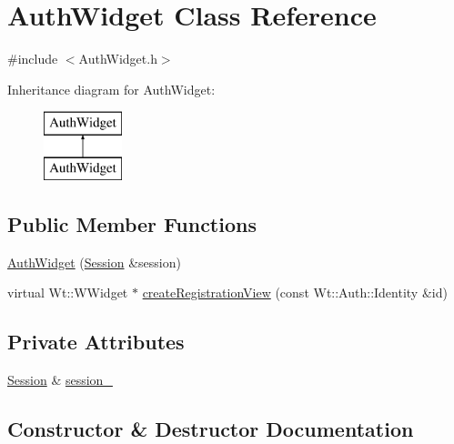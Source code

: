 \hypertarget{class_auth_widget}{}\section{Auth\+Widget Class Reference}
\label{class_auth_widget}


{\ttfamily \#include $<$Auth\+Widget.\+h$>$}

Inheritance diagram for Auth\+Widget\+:\begin{figure}[H]
\begin{center}
\leavevmode
\includegraphics[height=2.000000cm]{class_auth_widget}
\end{center}
\end{figure}
\subsection*{Public Member Functions}
\begin{DoxyCompactItemize}
\item 
\hyperlink{class_auth_widget_a16b0f0ad98e79aa40992cfaa9a00cfde}{Auth\+Widget} (\hyperlink{class_session}{Session} \&session)
\item 
virtual Wt\+::\+W\+Widget $\ast$ \hyperlink{class_auth_widget_abfa295703272e72a5d57dd736cc9f329}{create\+Registration\+View} (const Wt\+::\+Auth\+::\+Identity \&id)
\end{DoxyCompactItemize}
\subsection*{Private Attributes}
\begin{DoxyCompactItemize}
\item 
\hyperlink{class_session}{Session} \& \hyperlink{class_auth_widget_a9c1a0d3bf5d59ec8f0f6c7672e37224c}{session\+\_\+}
\end{DoxyCompactItemize}


\subsection{Constructor \& Destructor Documentation}
\mbox{\label{class_auth_widget_a16b0f0ad98e79aa40992cfaa9a00cfde}} 

